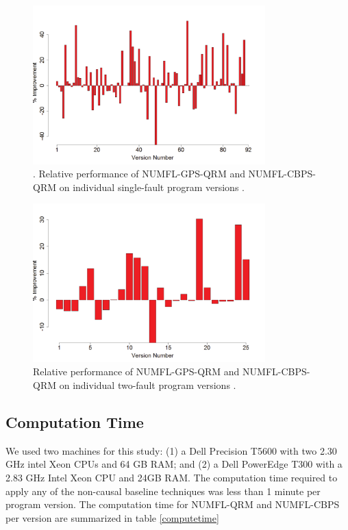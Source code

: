 \begin{figure}[!thpb]
\centering
\includegraphics[width=0.8\textwidth]{chapter3_CBPS_VS_GPS.pdf}
\caption{. Relative performance of NUMFL-GPS-QRM and NUMFL-CBPS-QRM on individual single-fault program versions .}
\label{CBPS_VS_GPS}
\end{figure}

\begin{figure}[!thpb]
\centering
\includegraphics[width=0.8\textwidth]{chapter3_CBPS_VS_GPS_MultipleFault.pdf}
\caption{Relative performance of NUMFL-GPS-QRM and NUMFL-CBPS-QRM on individual two-fault program versions .}
\label{CBPS_VS_GPS_MultipleFault}
\end{figure}

\subsection{Computation Time}
We used two machines for this study: (1) a Dell Precision T5600 with two 2.30 GHz intel Xeon CPUs and 64 GB RAM; and (2) a Dell PowerEdge T300 with a 2.83 GHz Intel Xeon CPU and 24GB RAM. The computation time required to apply any of the non-causal baseline techniques was less than 1 minute per program version. The computation time for NUMFL-QRM and NUMFL-CBPS per version are summarized in table \ref{computetime}

